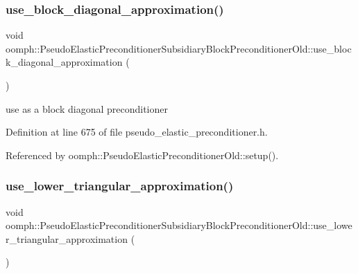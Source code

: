 \subsubsection{\texorpdfstring{use\+\_\+block\+\_\+diagonal\+\_\+approximation()}{use\_block\_diagonal\_approximation()}}
{\footnotesize\ttfamily void oomph\+::\+Pseudo\+Elastic\+Preconditioner\+Subsidiary\+Block\+Preconditioner\+Old\+::use\+\_\+block\+\_\+diagonal\+\_\+approximation (\begin{DoxyParamCaption}{ }\end{DoxyParamCaption})\hspace{0.3cm}{\ttfamily [inline]}}



use as a block diagonal preconditioner 



Definition at line 675 of file pseudo\+\_\+elastic\+\_\+preconditioner.\+h.



Referenced by oomph\+::\+Pseudo\+Elastic\+Preconditioner\+Old\+::setup().

\mbox{\label{classoomph_1_1PseudoElasticPreconditionerSubsidiaryBlockPreconditionerOld_a4ac42f45ed94d02f2fd25b3807653979}} 
\subsubsection{\texorpdfstring{use\+\_\+lower\+\_\+triangular\+\_\+approximation()}{use\_lower\_triangular\_approximation()}}
{\footnotesize\ttfamily void oomph\+::\+Pseudo\+Elastic\+Preconditioner\+Subsidiary\+Block\+Preconditioner\+Old\+::use\+\_\+lower\+\_\+triangular\+\_\+approximation (\begin{DoxyParamCaption}{ }\end{DoxyParamCaption})\hspace{0.3cm}{\ttfamily [inline]}}



